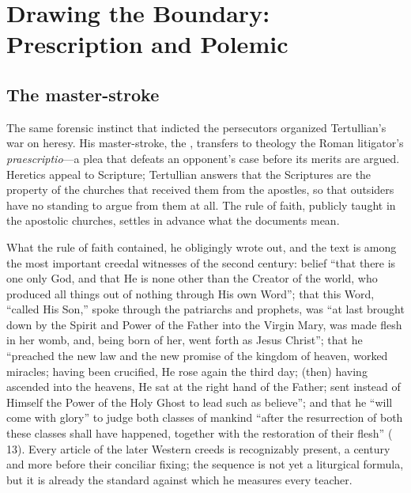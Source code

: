 \section{Drawing the Boundary: Prescription and Polemic}

\subsection{The master-stroke}

The same forensic instinct that indicted the persecutors organized Tertullian's
war on heresy. His master-stroke, the ,
transfers to theology the Roman litigator's \textit{praescriptio}---a plea that
defeats an opponent's case before its merits are argued. Heretics appeal to
Scripture; Tertullian answers that the Scriptures are the property of the
churches that received them from the apostles, so that outsiders have no
standing to argue from them at all. The rule of faith, publicly taught in the
apostolic churches, settles in advance what the documents mean.

What the rule of faith contained, he obligingly wrote out, and the text is
among the most important creedal witnesses of the second century: belief
``that there is one only God, and that He is none other than the Creator of
the world, who produced all things out of nothing through His own Word'';
that this Word, ``called His Son,'' spoke through the patriarchs and
prophets, was ``at last brought down by the Spirit and Power of the Father
into the Virgin Mary, was made flesh in her womb, and, being born of her,
went forth as Jesus Christ''; that he ``preached the new law and the new
promise of the kingdom of heaven, worked miracles; having been crucified, He
rose again the third day; (then) having ascended into the heavens, He sat at
the right hand of the Father; sent instead of Himself the Power of the Holy
Ghost to lead such as believe''; and that he ``will come with glory'' to
judge both classes of mankind ``after the resurrection of both these classes
shall have happened, together with the restoration of their flesh''
( 13). Every article of the later Western creeds is
recognizably present, a century and more before their conciliar fixing; the
sequence is not yet a liturgical formula, but it is already the standard
against which he measures every teacher.

